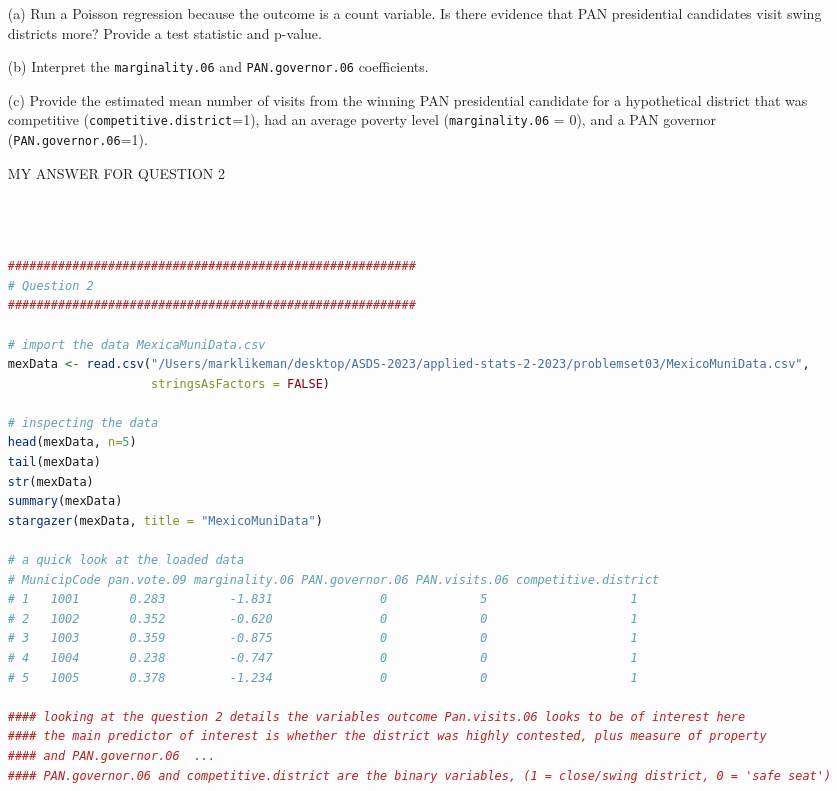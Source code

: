 \documentclass[12pt,letterpaper]{article}
\begin{document}
\begin{enumerate}
	\item [(a)]
	Run a Poisson regression because the outcome is a count variable. Is there evidence that PAN presidential candidates visit swing districts more? Provide a test statistic and p-value.

	\item [(b)]
	Interpret the \texttt{marginality.06} and \texttt{PAN.governor.06} coefficients.
	
	\item [(c)]
	Provide the estimated mean number of visits from the winning PAN presidential candidate for a hypothetical district that was competitive (\texttt{competitive.district}=1), had an average poverty level (\texttt{marginality.06} = 0), and a PAN governor (\texttt{PAN.governor.06}=1).
	
	
\noindent MY ANSWER FOR QUESTION 2


\begin{lstlisting}[language=R]



#########################################################
# Question 2
#########################################################

# import the data MexicaMuniData.csv
mexData <- read.csv("/Users/marklikeman/desktop/ASDS-2023/applied-stats-2-2023/problemset03/MexicoMuniData.csv",
                    stringsAsFactors = FALSE)

# inspecting the data
head(mexData, n=5)
tail(mexData)
str(mexData)
summary(mexData)
stargazer(mexData, title = "MexicoMuniData")

# a quick look at the loaded data
# MunicipCode pan.vote.09 marginality.06 PAN.governor.06 PAN.visits.06 competitive.district
# 1   1001       0.283         -1.831               0             5                    1
# 2   1002       0.352         -0.620               0             0                    1
# 3   1003       0.359         -0.875               0             0                    1
# 4   1004       0.238         -0.747               0             0                    1
# 5   1005       0.378         -1.234               0             0                    1

#### looking at the question 2 details the variables outcome Pan.visits.06 looks to be of interest here 
#### the main predictor of interest is whether the district was highly contested, plus measure of property  
#### and PAN.governor.06  ...
#### PAN.governor.06 and competitive.district are the binary variables, (1 = close/swing district, 0 = 'safe seat')



\end{lstlisting}
\end{enumerate}
\end{document}
